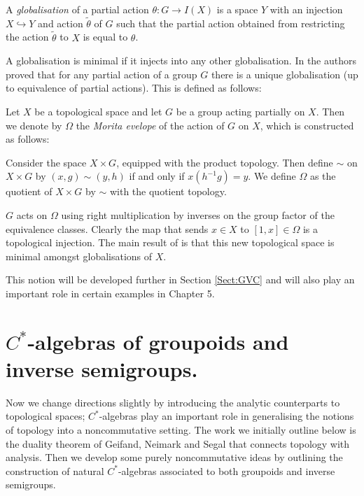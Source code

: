 \begin{definition}
A \textit{globalisation} of a partial action $\theta: G \rightarrow I(X)$ is a space $Y$ with an injection $X \hookrightarrow Y$ and action $\tilde{\theta}$ of $G$ such that the partial action obtained from restricting the action $\tilde{\theta}$ to $X$ is equal to $\theta$. 
\end{definition}

A globalisation is minimal if it injects into any other globalisation. In \cite{MR2041539} the authors proved that for any partial action of a group $G$ there is a unique globalisation (up to equivalence of partial actions). This is defined as follows:

\begin{definition}
Let $X$ be a topological space and let $G$ be a group acting partially on $X$. Then we denote by $\Omega$ the \textit{Morita evelope} of the action of $G$ on $X$, which is constructed as follows:

Consider the space $X\times G$, equipped with the product topology. Then define $\sim$ on $X\times G$ by $(x,g)\sim (y,h)$ if and only if $x(h^{-1}g)=y$. We define $\Omega$ as the quotient of $X\times G$ by $\sim$ with the quotient topology. 

$G$ acts on $\Omega$ using right multiplication by inverses on the group factor of the equivalence classes. Clearly the map that sends $x \in X$ to $[1,x] \in \Omega$ is a topological injection. The main result of \cite{MR2041539} is that this new topological space is minimal amongst globalisations of $X$.
\end{definition}

This notion will be developed further in Section \ref{Sect:GVC} and will also play an important role in certain examples in Chapter 5.

\section{\texorpdfstring{$C^{*}$}{C*}-algebras of groupoids and inverse semigroups.}
Now we change directions slightly by introducing the analytic counterparts to topological spaces; $C^{*}$-algebras play an important role in generalising the notions of topology into a noncommutative setting. The work we initially outline below is the duality theorem of Geifand, Neimark and Segal that connects topology with analysis. Then we develop some purely noncommutative ideas by outlining the construction of natural $C^{*}$-algebras associated to both groupoids and inverse semigroups.

